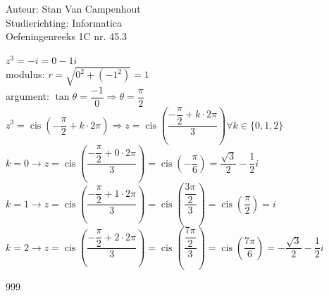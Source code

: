 \documentclass[a4paper]{article}
\begin{document}
  
\noindent \large Auteur: Stan Van Campenhout \\
\noindent \large Studierichting:  Informatica\\
\noindent \large Oefeningenreeks 1C nr. 45.3\\

\medskip

\normalsize

$ z^3 = -i = 0 - 1i $\\

modulus: $r = \sqrt{0^2 + (-1^2)} = 1 $\\

argument: $\tan\theta = \dfrac{-1}{0} \Rightarrow \theta = \dfrac{\pi}{2} $\\

$ z^3 = \operatorname{cis}\left(-\dfrac{\pi}{2} + k \cdot 2\pi\right) \Rightarrow z = \operatorname{cis}\left(\dfrac{-\dfrac{\pi}{2} + k \cdot 2\pi}{3}\right)
\forall k \in \{0, 1, 2\} $\\

$k = 0 \rightarrow z=\operatorname{cis}\left(\dfrac{-\dfrac{\pi}{2} + 0 \cdot 2\pi}{3}\right)=\operatorname{cis}\left(-\dfrac{\pi}{6}\right)
=\dfrac{\sqrt{3}}{2} - \dfrac{1}{2}i $\\

$k = 1 \rightarrow z=\operatorname{cis}\left(\dfrac{-\dfrac{\pi}{2} + 1 \cdot 2\pi}{3}\right) = \operatorname{cis}\left(\dfrac{\dfrac{3\pi}{2}}{3}\right)
= \operatorname{cis}\left(\dfrac{\pi}{2}\right) = i $\\

$k = 2 \rightarrow z=\operatorname{cis}\left(\dfrac{-\dfrac{\pi}{2} + 2 \cdot 2\pi}{3}\right)  = \operatorname{cis}\left(\dfrac{\dfrac{7\pi}{2}}{3}\right)
= \operatorname{cis}\left(\dfrac{7\pi}{6}\right) = -\dfrac{\sqrt{3}}{2} - \dfrac{1}{2}i $\\

\begin{thebibliography}{999}
\end{thebibliography}
\end{document}
